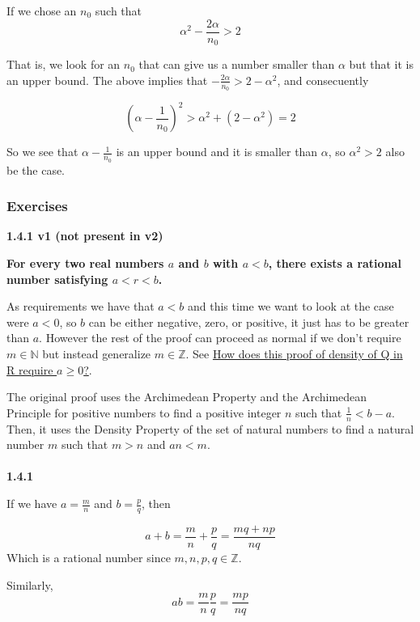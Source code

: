 If we chose an $n_0$ such that 
$$
\alpha^2 - \frac{2\alpha}{n_0} > 2
$$

That is, we look for an $n_0$ that can give us a number smaller than $\alpha$ but that it is an upper bound.
The above implies that $- \frac{2\alpha}{n_0} > 2 - \alpha^2$, and consecuently

$$
\left( \alpha - \frac{1}{n_0} \right)^2 >
    \alpha^2 + (2 - \alpha^2) = 2
$$

So we see that $\alpha - \frac{1}{n_0}$ is an upper bound and it is smaller than $\alpha$,
so $\alpha^2 > 2$ also be the case.



\subsubsection{Exercises}

\textbf{1.4.1 v1 (not present in v2)}

\textbf{For every two real numbers $a$ and $b$ with $a<b$, there exists a rational number satisfying $a < r < b$.}

As requirements we have that $a<b$ and this time we want to look at the case were $a<0$,
so $b$ can be either negative, zero, or positive, it just has to be greater than $a$.
However the rest of the proof can proceed as normal if we don't require $m \in \mathbb{N}$ but
instead generalize $m \in \mathbb{Z}$.
See
\href{https://math.stackexchange.com/questions/48537/how-does-this-proof-of-density-of-mathbbq-in-mathbbr-require-a-geq-0}{How does this proof of density of Q in R require $a\geq 0$?}.

The original proof uses the Archimedean Property and the Archimedean Principle for positive
numbers to find a positive integer $n$ such that $\frac{1}{n} < b - a$.
Then, it uses the Density Property of the set of natural numbers to find a natural number $m$
such that $m > n$ and $an < m$.
\\~\\



\textbf{1.4.1}

If we have $a = \frac{m}{n}$ and $b = \frac{p}{q}$, then

$$
a + b = \frac{m}{n} + \frac{p}{q}
    = \frac{mq + np}{nq}
$$
Which is a rational number since $m, n, p, q \in \mathbb{Z}$.

Similarly,
$$
ab = \frac{m}{n} \frac{p}{q}
    = \frac{mp}{nq}
$$

